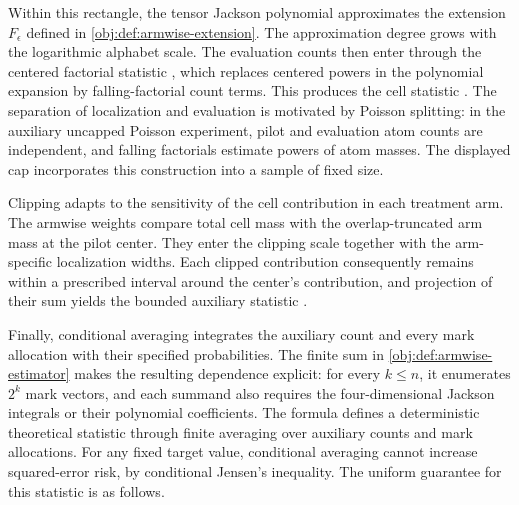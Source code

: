 Within this rectangle, the tensor Jackson polynomial  approximates the extension \(F_\epsilon\) defined in \cref{obj:def:armwise-extension}. The approximation degree  grows with the logarithmic alphabet scale. The evaluation counts  then enter through the centered factorial statistic , which replaces centered powers in the polynomial expansion by falling-factorial count terms. This produces the cell statistic . The separation of localization and evaluation is motivated by Poisson splitting: in the auxiliary uncapped Poisson experiment, pilot and evaluation atom counts are independent, and falling factorials estimate powers of atom masses. The displayed cap incorporates this construction into a sample of fixed size.

Clipping adapts to the sensitivity of the cell contribution in each treatment arm. The armwise weights  compare total cell mass with the overlap-truncated arm mass at the pilot center. They enter the clipping scale  together with the arm-specific localization widths. Each clipped contribution  consequently remains within a prescribed interval around the center's contribution, and projection of their sum yields the bounded auxiliary statistic .

Finally, conditional averaging integrates the auxiliary count and every mark allocation with their specified probabilities. The finite sum in \cref{obj:def:armwise-estimator} makes the resulting dependence explicit: for every \(k\le n\), it enumerates \(2^k\) mark vectors, and each summand also requires the four-dimensional Jackson integrals or their polynomial coefficients. The formula defines a deterministic theoretical statistic through finite averaging over auxiliary counts and mark allocations. For any fixed target value, conditional averaging cannot increase squared-error risk, by conditional Jensen's inequality. The uniform guarantee for this statistic is as follows.

